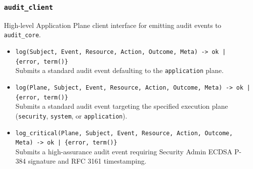 \documentclass{article}
\begin{document}
\subsubsection{\texttt{audit\_client}}
High-level Application Plane client interface for emitting audit events to \texttt{audit\_core}.
\begin{itemize}
    \item \texttt{log(Subject, Event, Resource, Action, Outcome, Meta) -> ok | \{error, term()\}} \\
    Submits a standard audit event defaulting to the \texttt{application} plane.
    \item \texttt{log(Plane, Subject, Event, Resource, Action, Outcome, Meta) -> ok | \{error, term()\}} \\
    Submits a standard audit event targeting the specified execution plane (\texttt{security}, \texttt{system}, or \texttt{application}).
    \item \texttt{log\_critical(Plane, Subject, Event, Resource, Action, Outcome, Meta) -> ok | \{error, term()\}} \\
    Submits a high-assurance audit event requiring Security Admin ECDSA P-384 signature and RFC 3161 timestamping.
\end{itemize}
\end{document}
